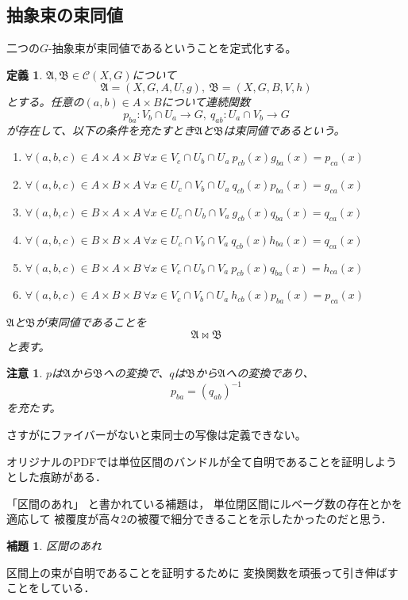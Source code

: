 \documentclass[leqno]{jsarticle}
\newtheorem{lem}[thm]{補題}
\newtheorem{df}[thm]{定義}
\newtheorem*{cau}{注意}
\begin{document}
\subsection{抽象束の束同値}
二つの$G$-抽象束が束同値であるということを定式化する。
\begin{df}
$\mathfrak{A},\mathfrak{B}\in \mathscr{C}(X,G)$について
\[
\mathfrak{A}=(X, G, A, U, g),\ \mathfrak{B}=(X, G, B, V, h)
\]
とする。任意の$(a, b)\in A\times B$について連続関数
\[
p_{ba}:V_b\cap U_a\to G,\ q_{ab}: U_a\cap V_b\to G
\]
が存在して、以下の条件を充たすとき$\mathfrak{A}$と$\mathfrak{B}$は束同値であるという。
\begin{enumerate}
\item $\forall (a,b,c)\in A\times A\times B\ \forall x\in  V_c\cap U_b\cap U_a\ p_{cb}(x)g_{ba}(x)=p_{ca}(x) $
\item $\forall (a,b,c)\in A\times B\times A\ \forall x\in  U_c\cap V_b\cap U_a\ q_{cb}(x)p_{ba}(x)=g_{ca}(x) $
\item $\forall (a,b,c)\in B\times A\times A\ \forall x\in  U_c\cap U_b\cap V_a\ g_{cb}(x)q_{ba}(x)=q_{ca}(x) $
\item $\forall (a,b,c)\in B\times B\times A\ \forall x\in  U_c\cap V_b\cap V_a\ q_{cb}(x)h_{ba}(x)=q_{ca}(x) $
\item $\forall (a,b,c)\in B\times A\times B\ \forall x\in  V_c\cap U_b\cap V_a\ p_{cb}(x)q_{ba}(x)=h_{ca}(x) $
\item $\forall (a,b,c)\in A\times B\times B\ \forall x\in  V_c\cap V_b\cap U_a\ h_{cb}(x)p_{ba}(x)=p_{ca}(x) $
\end{enumerate}
$\mathfrak{A}$と$\mathfrak{B}$が束同値であることを
\[
\mathfrak{A}\bowtie \mathfrak{B}
\]
と表す。
\end{df}
\begin{cau}
$p$は$\mathfrak{A}$から$\mathfrak{B}$への変換で、$q$は$\mathfrak{B}$から$\mathfrak{A}$への変換であり、
\[
p_{ba}=(q_{ab})^{-1}
\]
を充たす。
\end{cau}
さすがにファイバーがないと束同士の写像は定義できない。

オリジナルのPDFでは単位区間のバンドルが全て自明であることを証明しようとした痕跡がある．

「区間のあれ」
と書かれている補題は，
単位閉区間にルベーグ数の存在とかを適応して
被覆度が高々$2$の被覆で細分できることを示したかったのだと思う．
\begin{lem}
区間のあれ
\end{lem}

区間上の束が自明であることを証明するために
変換関数を頑張って引き伸ばすことをしている．
\end{document}
